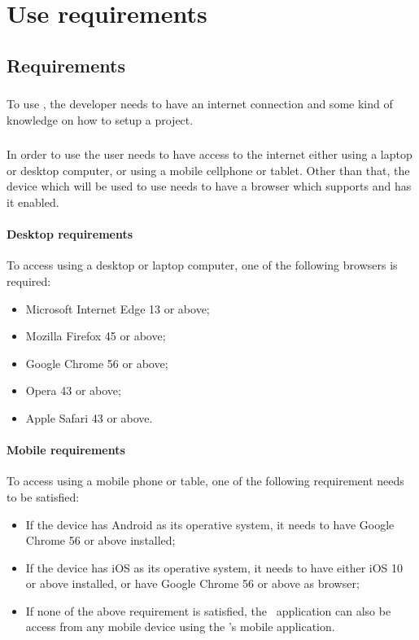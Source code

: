 \section{Use requirements}

\subsection{Requirements}
\subsubsection{\progettoShort}
To use \progettoShort, the developer needs to have an internet connection and some kind of knowledge on how to setup a  project.

\subsubsection{\app}
In order to use \app the user needs to have access to the internet either using a laptop or desktop computer, or using a mobile cellphone or tablet. Other than that, the device which will be used to use \app needs to have a browser which supports  and has it enabled.

\paragraph{Desktop requirements}
To access \app using a desktop or laptop computer, one of the following browsers is required:
\begin{itemize}
	\item Microsoft Internet Edge 13 or above;
	\item Mozilla Firefox 45 or above;
	\item Google Chrome 56 or above;
	\item Opera 43 or above;
	\item Apple Safari 43 or above.
\end{itemize}

\paragraph{Mobile requirements}
To access \app using a mobile phone or table, one of the following requirement needs to be satisfied:
\begin{itemize}
	\item If the device has Android as its operative system, it needs to have Google Chrome 56 or above installed;
	\item If the device has iOS as its operative system, it needs to have either iOS 10 or above installed, or have Google Chrome 56 or above as browser;
	\item If none of the above requirement is satisfied, the \app{}lication can also be access from any mobile device using the 's mobile application.
\end{itemize}

